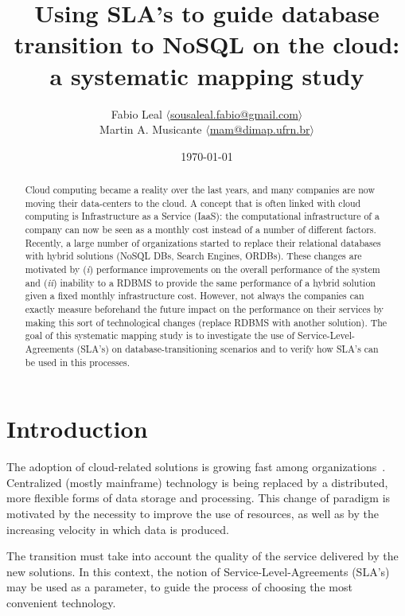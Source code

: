 \documentclass{article}
\begin{document}
\title{Using SLA’s to guide database transition to NoSQL on the cloud: a systematic mapping study}
\author{Fabio Leal $\langle$\href{mailto:sousaleal.fabio@gmail.com}%
{sousaleal.fabio@gmail.com}$\rangle$
\\
Martin A. Musicante $\langle$\href{mailto:mam@dimap.ufrn.br}%
{mam@dimap.ufrn.br}$\rangle$}
\date{\today}
\maketitle  




\begin{abstract}
Cloud computing became a reality over the last years, and many companies are now moving their data-centers to the cloud. 
A concept that is often linked with cloud computing is Infrastructure as a Service (IaaS): the computational infrastructure of a company can now be seen as a monthly cost instead of a number of different factors. 
Recently, a large number of organizations started to replace their relational databases with hybrid solutions (NoSQL DBs, Search Engines, ORDBs). 
These changes are motivated by (\textit{i}) performance improvements on the overall performance of the system and (\textit{ii}) inability to a RDBMS to provide the same performance of a hybrid solution given a fixed monthly infrastructure cost. 
However, not always the companies can exactly measure beforehand the future impact on the performance on their services by making this sort of technological changes (replace RDBMS with another solution). 
The goal of this systematic mapping study is to investigate the use of Service-Level-Agreements (SLA’s) on database-transitioning scenarios and to verify how SLA’s can be used in this processes.
\end{abstract}

\section{Introduction}

The adoption of cloud-related solutions is growing fast among organizations~\cite{XXX}.
Centralized (mostly mainframe) technology is being replaced by a distributed, more flexible forms of data storage and processing.
This change of paradigm is motivated by the necessity to improve the use of resources, as well as by the increasing velocity in which data is produced.

The transition must take into account the quality of the service delivered by the new solutions.
In this context, the notion of Service-Level-Agreements (SLA’s)~\cite{SLA} may be used as a parameter, to guide the process of choosing the most convenient technology.
\end{document}
